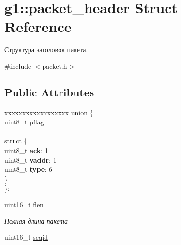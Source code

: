 \hypertarget{structg1_1_1packet__header}{}\section{g1\+:\+:packet\+\_\+header Struct Reference}
\label{structg1_1_1packet__header}


Структура заголовок пакета.  




{\ttfamily \#include $<$packet.\+h$>$}

\subsection*{Public Attributes}
\begin{DoxyCompactItemize}
\item 
\begin{tabbing}
xx\=xx\=xx\=xx\=xx\=xx\=xx\=xx\=xx\=\kill
union \{\\
\>uint8\_t \hyperlink{structg1_1_1packet__header_a77b86061c82d26733d902eb73af5976c}{pflag}\\
\>\\
\>struct \{\\
\>\>uint8\_t {\bfseries ack}: 1\\
\>\>uint8\_t {\bfseries vaddr}: 1\\
\>\>uint8\_t {\bfseries type}: 6\\
\>\} \hypertarget{uniong1_1_1packet__header_1_1_0D0_a4a3039864fea2668bb6bc713d929cd2a}{}\label{uniong1_1_1packet__header_1_1_0D0_a4a3039864fea2668bb6bc713d929cd2a}
\\
\}; \hypertarget{structg1_1_1packet__header_a51a68c60941af526631dac75cf46878f}{}\label{structg1_1_1packet__header_a51a68c60941af526631dac75cf46878f}
\\

\end{tabbing}\item 
uint16\+\_\+t \hyperlink{structg1_1_1packet__header_aed8789b03d7fa0c382855e97aaec4dd0}{flen}\hypertarget{structg1_1_1packet__header_aed8789b03d7fa0c382855e97aaec4dd0}{}\label{structg1_1_1packet__header_aed8789b03d7fa0c382855e97aaec4dd0}

\begin{DoxyCompactList}\small\item\em Полная длина пакета \end{DoxyCompactList}\item 
uint16\+\_\+t \hyperlink{structg1_1_1packet__header_a790712eb4ffb25fc506c895b183ca138}{seqid}\hypertarget{structg1_1_1packet__header_a790712eb4ffb25fc506c895b183ca138}{}\label{structg1_1_1packet__header_a790712eb4ffb25fc506c895b183ca138}


\end{DoxyCompactItemize}
